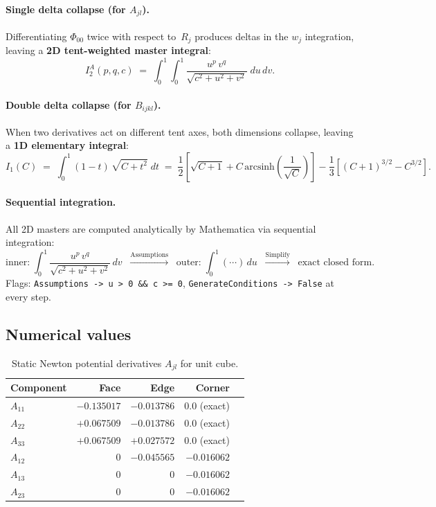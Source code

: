 \documentclass[11pt,a4paper]{article}
\theoremstyle{plain}
\theoremstyle{remark}
\begin{document}
\paragraph{Single delta collapse (for $A_{jl}$).}
Differentiating $\Phi_{00}$ twice with respect to~$R_j$ produces
deltas in the $w_j$ integration, leaving a \textbf{2D tent-weighted
master integral}:
\begin{equation}
  I^A_2(p,q,c) \;=\;
  \int_0^1\!\int_0^1
  \frac{u^p\,v^q}{\sqrt{c^2 + u^2 + v^2}}\;du\,dv.
  \label{eq:I2A}
\end{equation}

\paragraph{Double delta collapse (for $B_{ijkl}$).}
When two derivatives act on different tent axes, both dimensions
collapse, leaving a \textbf{1D elementary integral}:
\begin{equation}
  I_1(C) \;=\;
  \int_0^1 (1-t)\,\sqrt{C + t^2}\;dt
  \;=\; \frac{1}{2}\!\left[\sqrt{C+1} + C\,
  \mathrm{arcsinh}\!\left(\frac{1}{\sqrt{C}}\right)\right]
  - \frac{1}{3}\!\left[(C+1)^{3/2} - C^{3/2}\right].
  \label{eq:I1exact}
\end{equation}

\paragraph{Sequential integration.}
All 2D masters are computed analytically by Mathematica via
sequential integration:
\begin{equation}
  \text{inner:}\;
  \int_0^1 \frac{u^p\,v^q}{\sqrt{c^2+u^2+v^2}}\,dv
  \;\;\xrightarrow{\text{Assumptions}}\;\;
  \text{outer:}\;
  \int_0^1 (\cdots)\,du
  \;\;\xrightarrow{\text{Simplify}}\;\;
  \text{exact closed form.}
\end{equation}
Flags: \texttt{Assumptions -> u > 0 \&\& c >= 0},
\texttt{GenerateConditions -> False} at every step.

\subsection{Numerical values}

\begin{table}[ht]
\centering
\caption{Static Newton potential derivatives $A_{jl}$ for unit cube.}
\label{tab:static-A}
\begin{tabular}{l*{4}{r}}
\toprule
Component & Face & Edge & Corner \\
\midrule
$A_{11}$ & $-0.135017$ & $-0.013786$ & $0.0$ (exact) \\
$A_{22}$ & $+0.067509$ & $-0.013786$ & $0.0$ (exact) \\
$A_{33}$ & $+0.067509$ & $+0.027572$ & $0.0$ (exact) \\
$A_{12}$ & $0$ & $-0.045565$ & $-0.016062$ \\
$A_{13}$ & $0$ & $0$ & $-0.016062$ \\
$A_{23}$ & $0$ & $0$ & $-0.016062$ \\
\bottomrule
\end{tabular}
\end{table}
\end{document}
